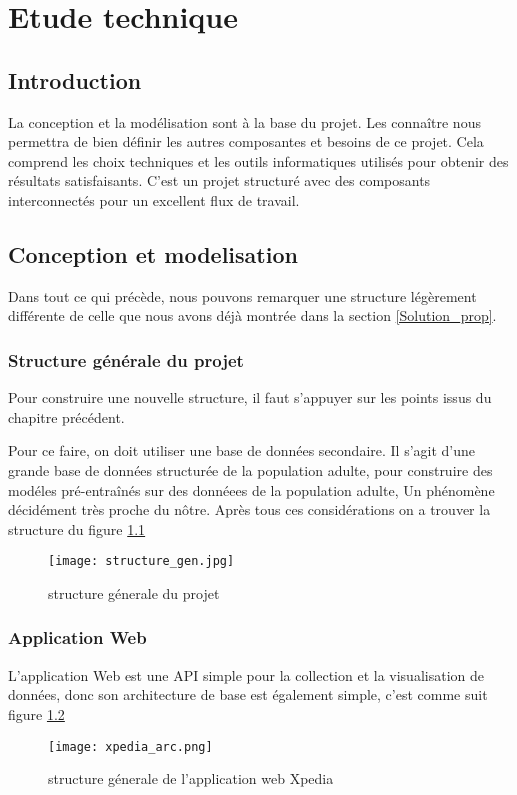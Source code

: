 \chapter{Etude technique}

\section*{Introduction}
La conception et la modélisation sont à la base du projet. Les connaître nous permettra de bien définir les autres composantes et besoins de ce projet. Cela comprend les choix techniques et les outils informatiques utilisés pour obtenir des résultats satisfaisants. C'est un projet  structuré avec des composants interconnectés pour un excellent flux de travail.

\section{Conception et modelisation}
Dans tout ce qui précède, nous pouvons remarquer une structure légèrement différente de celle que nous avons déjà montrée dans la section \ref{Solution_prop}.
    \subsection{Structure générale du projet}
    Pour construire une nouvelle structure, il faut s'appuyer sur les points issus du chapitre précédent.

    Pour ce faire, on doit utiliser une base de données secondaire. Il s'agit d'une grande base de données structurée de la population adulte, pour construire des modéles pré-entraînés sur des donnéees de la population adulte, Un phénomène décidément très proche du nôtre.
    Après tous ces considérations on a trouver la structure du figure \ref{fig:structure_gen}
    \begin{figure}[H]
        \centering
        \texttt{[image: structure\_gen.jpg]}
        \caption{structure génerale du projet}\label{fig:structure_gen}
    \end{figure}
    \subsection{Application Web}
        L'application Web est une API simple pour la collection et la visualisation de données, donc son architecture de base est également simple, c'est comme suit figure \ref{fig:xpedia_arc}
        \begin{figure}[H]
            \centering
            \texttt{[image: xpedia\_arc.png]}
            \caption{structure génerale de l'application web Xpedia}\label{fig:xpedia_arc}
        \end{figure}
